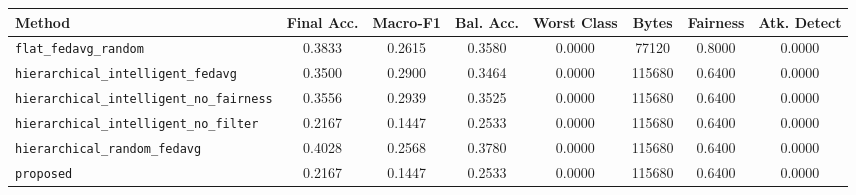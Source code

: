 \begin{tabular}{lccccccc}
\toprule
Method & Final Acc. & Macro-F1 & Bal. Acc. & Worst Class & Bytes & Fairness & Atk. Detect \\
\midrule
\texttt{flat\_fedavg\_random} & 0.3833 & 0.2615 & 0.3580 & 0.0000 & 77120 & 0.8000 & 0.0000 \\
\texttt{hierarchical\_intelligent\_fedavg} & 0.3500 & 0.2900 & 0.3464 & 0.0000 & 115680 & 0.6400 & 0.0000 \\
\texttt{hierarchical\_intelligent\_no\_fairness} & 0.3556 & 0.2939 & 0.3525 & 0.0000 & 115680 & 0.6400 & 0.0000 \\
\texttt{hierarchical\_intelligent\_no\_filter} & 0.2167 & 0.1447 & 0.2533 & 0.0000 & 115680 & 0.6400 & 0.0000 \\
\texttt{hierarchical\_random\_fedavg} & 0.4028 & 0.2568 & 0.3780 & 0.0000 & 115680 & 0.6400 & 0.0000 \\
\texttt{proposed} & 0.2167 & 0.1447 & 0.2533 & 0.0000 & 115680 & 0.6400 & 0.0000 \\
\bottomrule
\end{tabular}
